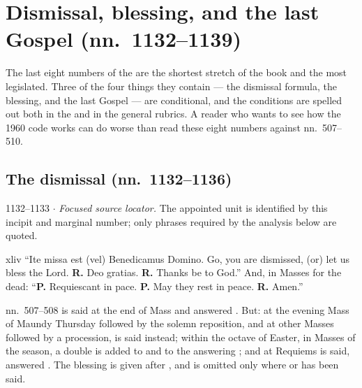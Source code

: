 \section{Dismissal, blessing, and the last Gospel (nn.~1132--1139)}

The last eight numbers of the  are the shortest stretch of
the book and the most legislated. Three of the four things they contain ---
the dismissal formula, the blessing, and the last Gospel --- are conditional,
and the conditions are spelled out both in the  and in the general
rubrics. A reader who wants to see how the 1960 code works can do worse than
read these eight numbers against nn.~507--510.

\subsection*{The dismissal (nn.~1132--1136)}

\begin{appointed}{1132--1133 $\cdot$ }
\textit{Focused source locator.} The appointed unit is identified by this incipit and marginal number; only phrases required by the analysis below are quoted.
\end{appointed}

\begin{englishwitness}{xliv}
``Ite missa est (vel) Benedicamus Domino. Go, you are dismissed, (or) let us
bless the Lord. \textbf{R.} Deo gratias. \textbf{R.} Thanks be to God.'' And,
in Masses for the dead: ``\textbf{P.} Requiescant in pace. \textbf{P.} May they
rest in peace. \textbf{R.} Amen.''
\end{englishwitness}

\begin{rubricnote}{ nn.~507--508}
 is said at the end of Mass and answered . But: at the evening Mass of Maundy Thursday followed by the solemn
reposition, and at other Masses followed by a procession,  is said instead; within the octave of Easter, in Masses of the season,
a double  is added to  and to the
answering ; and at Requiems  is said, answered . The blessing is given after
, and is omitted only where  or
 has been said.
\end{rubricnote}

